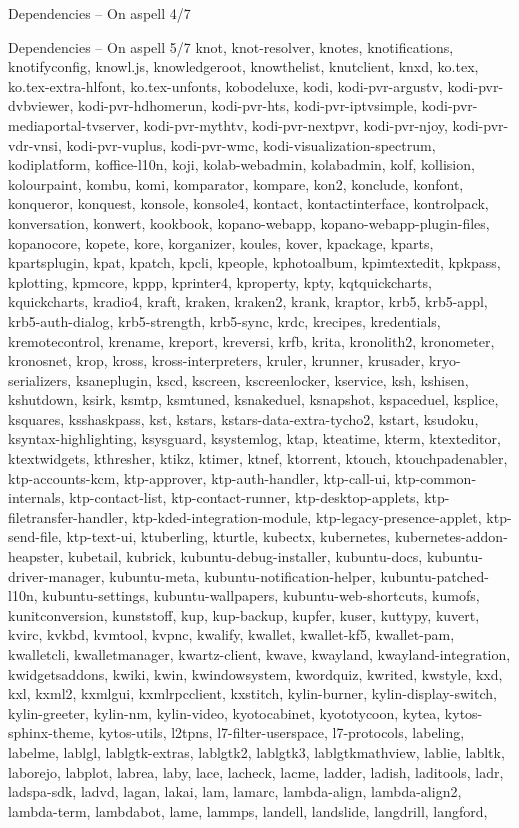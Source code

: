\documentclass{beamer}
\begin{document}
\begin{frame}{Dependencies – On aspell 4/7}
\end{frame}

\begin{frame}{Dependencies – On aspell 5/7}
\tiny knot, knot-resolver, knotes, knotifications, knotifyconfig, knowl.js, knowledgeroot, knowthelist, knutclient, knxd, ko.tex, ko.tex-extra-hlfont, ko.tex-unfonts, kobodeluxe, kodi, kodi-pvr-argustv, kodi-pvr-dvbviewer, kodi-pvr-hdhomerun, kodi-pvr-hts, kodi-pvr-iptvsimple, kodi-pvr-mediaportal-tvserver, kodi-pvr-mythtv, kodi-pvr-nextpvr, kodi-pvr-njoy, kodi-pvr-vdr-vnsi, kodi-pvr-vuplus, kodi-pvr-wmc, kodi-visualization-spectrum, kodiplatform, koffice-l10n, koji, kolab-webadmin, kolabadmin, kolf, kollision, kolourpaint, kombu, komi, komparator, kompare, kon2, konclude, konfont, konqueror, konquest, konsole, konsole4, kontact, kontactinterface, kontrolpack, konversation, konwert, kookbook, kopano-webapp, kopano-webapp-plugin-files, kopanocore, kopete, kore, korganizer, koules, kover, kpackage, kparts, kpartsplugin, kpat, kpatch, kpcli, kpeople, kphotoalbum, kpimtextedit, kpkpass, kplotting, kpmcore, kppp, kprinter4, kproperty, kpty, kqtquickcharts, kquickcharts, kradio4, kraft, kraken, kraken2, krank, kraptor, krb5, krb5-appl, krb5-auth-dialog, krb5-strength, krb5-sync, krdc, krecipes, kredentials, kremotecontrol, krename, kreport, kreversi, krfb, krita, kronolith2, kronometer, kronosnet, krop, kross, kross-interpreters, kruler, krunner, krusader, kryo-serializers, ksaneplugin, kscd, kscreen, kscreenlocker, kservice, ksh, kshisen, kshutdown, ksirk, ksmtp, ksmtuned, ksnakeduel, ksnapshot, kspaceduel, ksplice, ksquares, ksshaskpass, kst, kstars, kstars-data-extra-tycho2, kstart, ksudoku, ksyntax-highlighting, ksysguard, ksystemlog, ktap, kteatime, kterm, ktexteditor, ktextwidgets, kthresher, ktikz, ktimer, ktnef, ktorrent, ktouch, ktouchpadenabler, ktp-accounts-kcm, ktp-approver, ktp-auth-handler, ktp-call-ui, ktp-common-internals, ktp-contact-list, ktp-contact-runner, ktp-desktop-applets, ktp-filetransfer-handler, ktp-kded-integration-module, ktp-legacy-presence-applet, ktp-send-file, ktp-text-ui, ktuberling, kturtle, kubectx, kubernetes, kubernetes-addon-heapster, kubetail, kubrick, kubuntu-debug-installer, kubuntu-docs, kubuntu-driver-manager, kubuntu-meta, kubuntu-notification-helper, kubuntu-patched-l10n, kubuntu-settings, kubuntu-wallpapers, kubuntu-web-shortcuts, kumofs, kunitconversion, kunststoff, kup, kup-backup, kupfer, kuser, kuttypy, kuvert, kvirc, kvkbd, kvmtool, kvpnc, kwalify, kwallet, kwallet-kf5, kwallet-pam, kwalletcli, kwalletmanager, kwartz-client, kwave, kwayland, kwayland-integration, kwidgetsaddons, kwiki, kwin, kwindowsystem, kwordquiz, kwrited, kwstyle, kxd, kxl, kxml2, kxmlgui, kxmlrpcclient, kxstitch, kylin-burner, kylin-display-switch, kylin-greeter, kylin-nm, kylin-video, kyotocabinet, kyototycoon, kytea, kytos-sphinx-theme, kytos-utils, l2tpns, l7-filter-userspace, l7-protocols, labeling, labelme, lablgl, lablgtk-extras, lablgtk2, lablgtk3, lablgtkmathview, lablie, labltk, laborejo, labplot, labrea, laby, lace, lacheck, lacme, ladder, ladish, laditools, ladr, ladspa-sdk, ladvd, lagan, lakai, lam, lamarc, lambda-align, lambda-align2, lambda-term, lambdabot, lame, lammps, landell, landslide, langdrill, langford, 
\end{frame}
\end{document}
